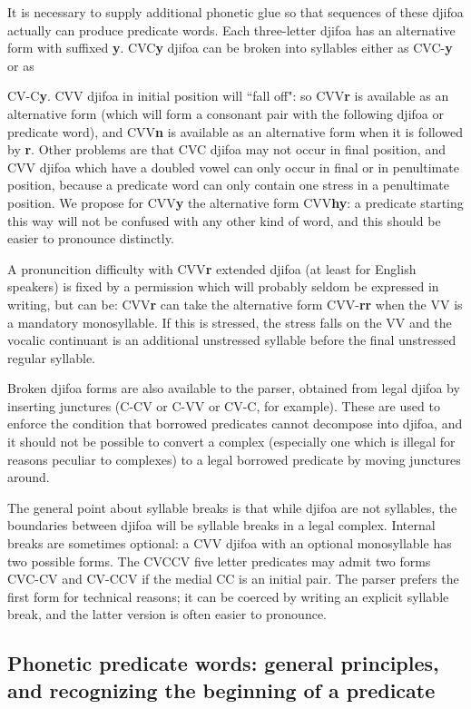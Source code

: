 \documentclass[12pt]{book}
\begin{document}
It is necessary to supply additional phonetic glue so that sequences of these djifoa actually can produce predicate words.  Each three-letter djifoa has an alternative form
with suffixed {\bf y}.  CVC{\bf y}  djifoa can be broken into syllables either as CVC-{\bf y} or as {CV-C{\bf y}.  CVV djifoa in initial position will ``fall off":  so CVV{\bf r} is available as an alternative form (which will form a consonant pair with the following djifoa or predicate word), and CVV{\bf n} is available as an alternative form when it is followed by {\bf r}.  Other problems
are that CVC djifoa may not occur in final position, and CVV djifoa which have a doubled vowel can only occur in final or in penultimate position, because a predicate word can only contain one stress in a penultimate position.  We propose for CVV{\bf y} the alternative form CVV{\bf hy}:  a predicate starting this way will not be confused with any other kind of word, and this should be easier to pronounce distinctly.

A pronuncition difficulty with CVV{\bf r} extended djifoa (at least for English speakers) is fixed by a permission which will probably seldom be expressed in writing, but can be:
CVV{\bf r} can take the alternative form CVV-{\bf rr} when the VV is a mandatory monosyllable.  If this is stressed, the stress falls on the VV and the vocalic continuant is an additional unstressed syllable before the final unstressed regular syllable.

Broken djifoa forms are also available to the parser, obtained from legal djifoa by inserting junctures (C-CV or C-VV  or CV-C, for example).  These are used to enforce the condition that borrowed predicates cannot decompose into djifoa, and it should not be possible to convert a complex (especially one which is illegal for reasons peculiar to complexes) to a legal borrowed predicate by moving junctures around.

The general point about syllable breaks is that while djifoa are not syllables, the boundaries between djifoa will be syllable breaks in a legal complex.  Internal breaks are sometimes
optional:  a CVV djifoa with an optional monosyllable has two possible forms.  The CVCCV five letter predicates may admit two forms CVC-CV and CV-CCV if the medial CC is an initial pair.
The parser prefers the first form for technical reasons;  it can be coerced by writing an explicit syllable break, and the latter version is often easier to pronounce.

\subsection{Phonetic predicate words:  general principles, and recognizing the beginning of a predicate}

}
\end{document}
